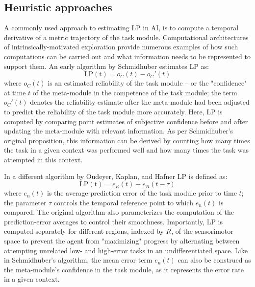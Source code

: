 \subsection{Heuristic approaches}

A commonly used approach to estimating \ac{LP} in \ac{AI}, is to compute a temporal derivative of a metric trajectory of the task module. Computational architectures of intrinsically-motivated exploration provide numerous examples of how such computations can be carried out and what information needs to be represented to support them. An early algorithm by Schmidhuber \cite{schmidhuber_curious_1991} estimates \ac{LP} as:
\begin{equation}
    \mathrm{LP(t)} = o_C(t) - o_C'(t)
\end{equation}
where $o_C(t)$ is an estimated reliability of the task module -- or the "confidence" at time $t$ of the meta-module in the competence of the task module; the term $o_C'(t)$ denotes the reliability estimate after the meta-module had been adjusted to predict the reliability of the task module more accurately. Here, \ac{LP} is computed by comparing point estimates of subjective confidence before and after updating the meta-module with relevant information. As per Schmidhuber's original proposition, this information can be derived by counting how many times the task in a given context was performed well and how many times the task was attempted in this context.

In a different algorithm by Oudeyer, Kaplan, and Hafner \cite{oudeyer_intrinsic_2007} \ac{LP} is defined as:
\begin{equation}
    \mathrm{LP(t)} = e_R(t) - e_R(t-\tau)
\end{equation}
where $e_n(t)$ is the average prediction error of the task module prior to time $t$; the parameter $\tau$ controls the temporal reference point to which $e_n(t)$ is compared. The original algorithm also parameterizes the computation of the prediction-error averages to control their smoothness. Importantly, \ac{LP} is computed separately for different regions, indexed by $R$, of the sensorimotor space to prevent the agent from "maximizing" progress by alternating between attempting unrelated low- and high-error tasks in an undifferentiated space. Like in Schmidhuber's algorithm, the mean error term $e_n(t)$ can also be construed as the meta-module's confidence in the task module, as it represents the error rate in a given context. 


